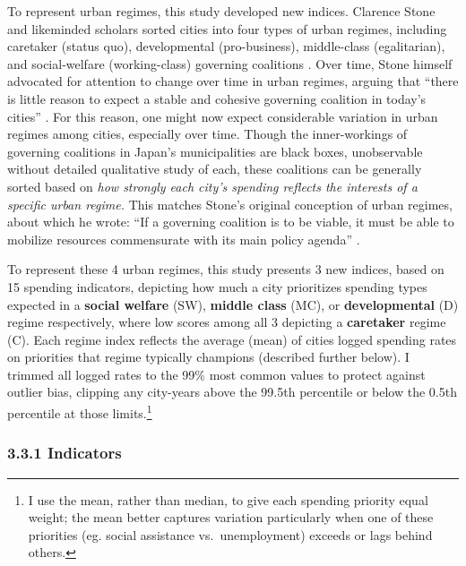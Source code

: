 \documentclass[preprint, 3p,
authoryear]{elsarticle} %
\begin{document}
To represent urban regimes, this study developed new indices. Clarence
Stone and likeminded scholars sorted cities into four types of urban
regimes, including caretaker (status quo), developmental (pro-business),
middle-class (egalitarian), and social-welfare (working-class) governing
coalitions
\citep{stone_1989, stoker_and_mossberger_1994, mossberger_and_stoker_2001, kilburn_2004, de_socio_2007}.
Over time, Stone himself advocated for attention to change over time in
urban regimes, arguing that ``there is little reason to expect a stable
and cohesive governing coalition in today's cities''
\citep{stone_et_al_2015}. For this reason, one might now expect
considerable variation in urban regimes among cities, especially over
time. Though the inner-workings of governing coalitions in Japan's
municipalities are black boxes, unobservable without detailed
qualitative study of each, these coalitions can be generally sorted
based on \emph{how strongly each city's spending reflects the interests
of a specific urban regime.} This matches Stone's original conception of
urban regimes, about which he wrote: ``If a governing coalition is to be
viable, it must be able to mobilize resources commensurate with its main
policy agenda'' \citep{stone_1993}.

To represent these 4 urban regimes, this study presents 3 new indices,
based on 15 spending indicators, depicting how much a city prioritizes
spending types expected in a \textbf{social welfare} (SW),
\textbf{middle class} (MC), or \textbf{developmental} (D) regime
respectively, where low scores among all 3 depicting a
\textbf{caretaker} regime (C). Each regime index reflects the average
(mean) of cities logged spending rates on priorities that regime
typically champions (described further below). I trimmed all logged
rates to the 99\% most common values to protect against outlier bias,
clipping any city-years above the 99.5th percentile or below the 0.5th
percentile at those limits.\footnote{I use the mean, rather than median,
  to give each spending priority equal weight; the mean better captures
  variation particularly when one of these priorities (eg. social
  assistance vs.~unemployment) exceeds or lags behind others.}

\hypertarget{indicators}{%
\subsubsection{3.3.1 Indicators}\label{indicators}}
\end{document}
